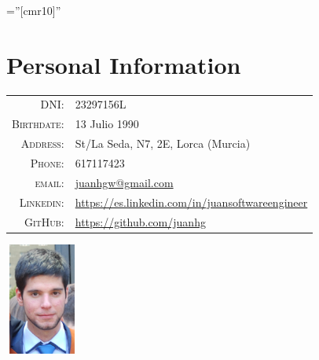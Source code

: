 \documentclass[a4paper,10pt]{article} %
\begin{document}
\pagestyle{empty} %

\font\fb=''[cmr10]'' %


\par{\bigskip\par} %

\section{Personal Information}

\noindent\begin{minipage}{0.3\textwidth}%
\begin{tabular}{rl}
\textsc{DNI:} & 23297156L \\
\textsc{Birthdate:} & 13 Julio 1990 \\
\textsc{Address:} & St/La Seda, N7, 2E, Lorca (Murcia) \\
\textsc{Phone:} & 617117423\\
\textsc{email:} & \href{mailto:juanhgw@gmail.com}{juanhgw@gmail.com} \\
\textsc{Linkedin:} & \url{https://es.linkedin.com/in/juansoftwareengineer} \\
\textsc{GitHub:} & \url{https://github.com/juanhg}
\end{tabular}
\end{minipage}%
\hfill%
\begin{minipage}{0.6\textwidth}\raggedleft
\includegraphics[width=24mm, height=37mm]{pictures/photo2}
\end{minipage}

\end{document}
